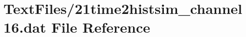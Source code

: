 \hypertarget{21time2histsim__channel16_8dat}{}\section{Text\+Files/21time2histsim\+\_\+channel16.dat File Reference}
\label{21time2histsim__channel16_8dat}
